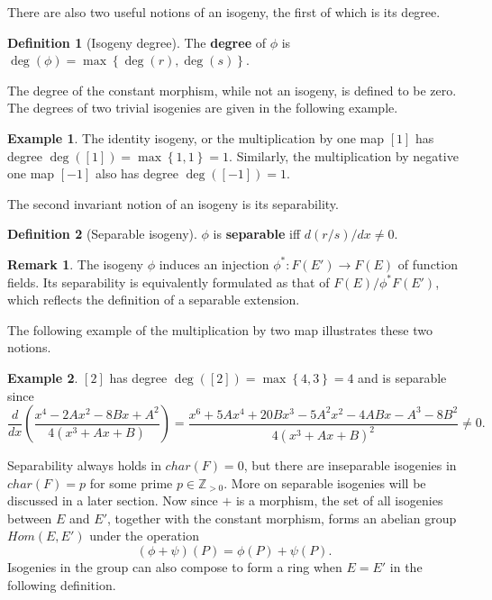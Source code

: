 \documentclass{article}
\newcommand{\Z}{\mathbb{Z}}
\newcommand{\rb}[1]{\left( #1 \right)}
\renewcommand{\sb}[1]{\left[ #1 \right]}
\newcommand{\cb}[1]{\left\{ #1 \right\}}
\theoremstyle{definition}
\newtheorem*{definition}{Definition}
\newtheorem*{example}{Example}
\newtheorem*{remark}{Remark}
\begin{document}
There are also two useful notions of an isogeny, the first of which is its degree.

\begin{definition}[Isogeny degree]
The \textbf{degree} of $ \phi $ is $ \deg\rb{\phi} = \max\cb{\deg\rb{r}, \deg\rb{s}} $.
\end{definition}

The degree of the constant morphism, while not an isogeny, is defined to be zero. The degrees of two trivial isogenies are given in the following example.

\begin{example}
The identity isogeny, or the multiplication by one map $ \sb{1} $ has degree $ \deg\rb{\sb{1}} = \max\cb{1, 1} = 1 $. Similarly, the multiplication by negative one map $ \sb{-1} $ also has degree $ \deg\rb{\sb{-1}} = 1 $.
\end{example}

\pagebreak

The second invariant notion of an isogeny is its separability.

\begin{definition}[Separable isogeny]
$ \phi $ is \textbf{separable} iff $ d\rb{r / s} / dx \ne 0 $.
\end{definition}

\begin{remark}
The isogeny $ \phi $ induces an injection $ \phi^* : F\rb{E'} \to F\rb{E} $ of function fields. Its separability is equivalently formulated as that of $ F\rb{E} / \phi^*F\rb{E'} $, which reflects the definition of a separable extension.
\end{remark}

The following example of the multiplication by two map illustrates these two notions.

\begin{example}
$ \sb{2} $ has degree $ \deg\rb{\sb{2}} = \max\cb{4, 3} = 4 $ and is separable since
$$ \dfrac{d}{dx}\rb{\dfrac{x^4 - 2Ax^2 - 8Bx + A^2}{4\rb{x^3 + Ax + B}}} = \dfrac{x^6 + 5Ax^4 + 20Bx^3 - 5A^2x^2 - 4ABx - A^3 - 8B^2}{4\rb{x^3 + Ax + B}^2} \ne 0. $$
\end{example}

Separability always holds in $ char\rb{F} = 0 $, but there are inseparable isogenies in $ char\rb{F} = p $ for some prime $ p \in \Z_{> 0} $. More on separable isogenies will be discussed in a later section. Now since $ + $ is a morphism, the set of all isogenies between $ E $ and $ E' $, together with the constant morphism, forms an abelian group $ Hom\rb{E, E'} $ under the operation
$$ \rb{\phi + \psi}\rb{P} = \phi\rb{P} + \psi\rb{P}. $$
Isogenies in the group can also compose to form a ring when $ E = E' $ in the following definition.
\end{document}
